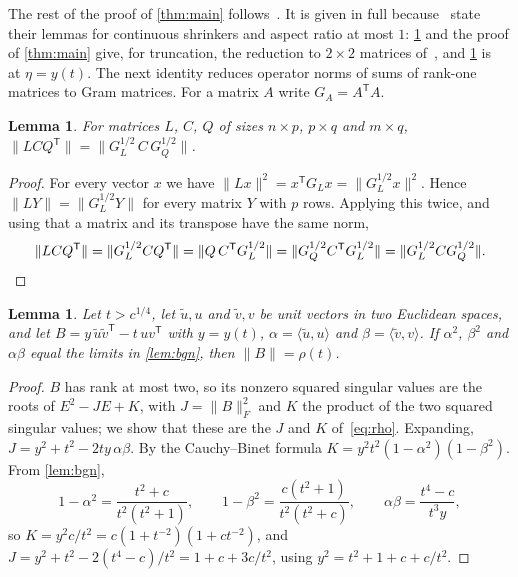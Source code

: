 \documentclass[11pt]{amsart}
\newtheorem{lem}[thm]{Lemma}
\theoremstyle{remark}
\numberwithin{equation}{section}
\begin{document}
The rest of the proof of \cref{thm:main} follows~\cite[Section~5]{GD}. It is given in full because~\cite{GD} state their lemmas for continuous shrinkers and aspect ratio at most $1$: \cref{lem:gram} and the proof of \cref{thm:main} give, for truncation, the reduction to $2\times2$ matrices of~\cite[Lemmas~8 and~9]{GD}, and \cref{lem:block} is~\cite[Lemma~13]{GD} at $\eta=y(t)$. The next identity reduces operator norms of sums of rank-one matrices to Gram matrices. For a matrix $A$ write $G_A=A^{\mathsf T}A$.

\begin{lem}\label{lem:gram}
For matrices $L$, $C$, $Q$ of sizes $n\times p$, $p\times q$ and $m\times q$, $\|LCQ^{\mathsf T}\|=\|G_L^{1/2}\,C\,G_Q^{1/2}\|$.
\end{lem}

\begin{proof}
For every vector $x$ we have $\|Lx\|^2=x^{\mathsf T}G_Lx=\|G_L^{1/2}x\|^2$. Hence $\|LY\|=\|G_L^{1/2}Y\|$ for every matrix $Y$ with $p$ rows. Applying this twice, and using that a matrix and its transpose have the same norm,
\[
\|LCQ^{\mathsf T}\|=\|G_L^{1/2}CQ^{\mathsf T}\|=\|Q\,C^{\mathsf T}G_L^{1/2}\|=\|G_Q^{1/2}C^{\mathsf T}G_L^{1/2}\|=\|G_L^{1/2}CG_Q^{1/2}\|. \qedhere
\]
\end{proof}

\begin{lem}\label{lem:block}
Let $t>c^{1/4}$, let $\tilde u,u$ and $\tilde v,v$ be unit vectors in two Euclidean spaces, and let $B=y\,\tilde u\tilde v^{\mathsf T}-t\,uv^{\mathsf T}$ with $y=y(t)$, $\alpha=\langle\tilde u,u\rangle$ and $\beta=\langle\tilde v,v\rangle$. If $\alpha^2$, $\beta^2$ and $\alpha\beta$ equal the limits in \cref{lem:bgn}, then $\|B\|=\rho(t)$.
\end{lem}

\begin{proof}
$B$ has rank at most two, so its nonzero squared singular values are the roots of $E^2-JE+K$, with $J=\|B\|_F^2$ and $K$ the product of the two squared singular values; we show that these are the $J$ and $K$ of~\eqref{eq:rho}. Expanding, $J=y^2+t^2-2ty\,\alpha\beta$. By the Cauchy--Binet formula $K=y^2t^2(1-\alpha^2)(1-\beta^2)$. From \cref{lem:bgn},
\[
1-\alpha^2=\frac{t^2+c}{t^2(t^2+1)},\qquad 1-\beta^2=\frac{c(t^2+1)}{t^2(t^2+c)},\qquad \alpha\beta=\frac{t^4-c}{t^3y},
\]
so $K=y^2c/t^2=c(1+t^{-2})(1+ct^{-2})$, and $J=y^2+t^2-2(t^4-c)/t^2=1+c+3c/t^2$, using $y^2=t^2+1+c+c/t^2$.
\end{proof}
\end{document}
